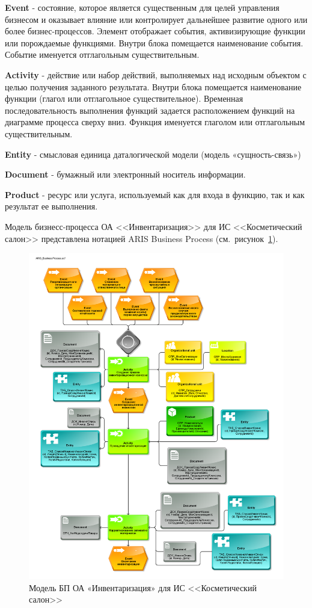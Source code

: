 \textbf{Event} - состояние, которое является существенным для целей управления бизнесом
и оказывает влияние или контролирует дальнейшее развитие одного или более бизнес-процессов.
Элемент отображает события, активизирующие функции или порождаемые функциями.
Внутри блока помещается наименование события.
Событие именуется отглагольным существительным.

\textbf{Activity} - действие или набор действий, выполняемых над исходным объектом с целью получения заданного результата.
Внутри блока помещается наименование функции (глагол или отглагольное существительное).
Временная последовательность выполнения функций задается расположением функций на диаграмме процесса сверху вниз.
Функция именуется глаголом или отглагольным существительным.

\textbf{Entity} - смысловая единица даталогической модели (модель «сущность-связь»)

\textbf{Document} - бумажный или электронный носитель информации.

\textbf{Product} - ресурс или услуга, используемый как для входа в функцию, так и как результат ее выполнения.

Модель бизнесс-процесса ОА <<Инвентаризация>> для ИС <<Косметический салон>> представлена нотацией ARIS Business Process
(см.~рисунок~\ref{fig:ARIS_BusinessProcess}).

\newpage

\begin{figure}[!h]
    \centering

    \includegraphics[width=18cm]
    {assets/ARIS/ARIS_BusinessProcess.adf.pdf}

    \caption{Модель БП ОА «Инвентаризация» для ИС <<Косметический салон>>}

    \label{fig:ARIS_BusinessProcess}
\end{figure}

\newpage
